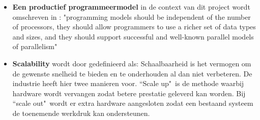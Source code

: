 \begin{itemize}
    \item \textbf{Een productief programmeermodel} in de context van dit project wordt omschreven in \textcite{asanovic2006landscape}: "programming models should be independent of the number of processors, they should allow programmers to use a richer set of data types and sizes, and they should support successful and well-known parallel models of parallelism"

    \item \textbf{Scalability} wordt door \textcite{dubey2005recognition} gedefinieerd als: Schaalbaarheid is het vermogen om de gewenste snelheid te bieden en te onderhouden al dan niet verbeteren. De industrie heeft hier twee manieren voor. ``Scale up"\ is de methode waarbij hardware wordt vervangen zodat betere prestatie geleverd kan worden. Bij ``scale out"\ wordt er extra hardware aangesloten zodat een bestaand systeem de toenemende werkdruk kan ondersteunen.
\end{itemize}

\begin{comment}
TODO
\begin{itemize}
    \item Data aggregaties moeten plaatsvinden zodra kosten beschikbaar zijn per publisher
    
    \item voor probleem scenario 1 en 4, moet mogelijk zijn om voor een individuele webwinkels de data te aggregeren zodat er correcties kunnen worden gemaakt bij data kwaliteit issues. 
    \item de snelheid waarmee data wordt verwerkt moet snel genoeg zijn om 30 dagen aan data binnen 1 dag te verwerken.
    
    \item De tijd die het kost voor data aggregaties moet voorspelbaar zijn, dit kan worden bereikt wanneer de oplossing lineair schaalbaar is.
\end{itemize}

\end{comment}


